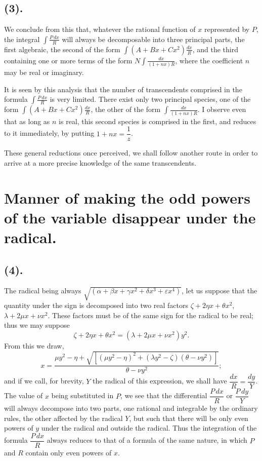 \documentclass{article}
\begin{document}
\subsection*{(3).}

We conclude from this that, whatever the rational function of $x$ represented by $P$, the integral $\displaystyle\int\frac{P\,dx}{R}$ will always be decomposable into three principal parts, the first algebraic, the second of the form $\displaystyle\int(A+Bx+Cx^{2})\frac{dx}{R}$, and the third containing one or more terms of the form $\displaystyle N\int\frac{dx}{(1+nx)R}$, where the coefficient $n$ may be real or imaginary.

It is seen by this analysis that the number of transcendents comprised in the formula $\displaystyle\int\frac{P\,dx}{R}$ is very limited. There exist only two principal species, one of the form $\displaystyle\int(A+Bx+Cx^{2})\frac{dx}{R}$, the other of the form $\displaystyle\int\frac{dx}{(1+nx)R}$. I observe even that as long as $n$ is real, this second species is comprised in the first, and reduces to it immediately, by putting $1+nx=\dfrac{1}{z}$.

These general reductions once perceived, we shall follow another route in order to arrive at a more precise knowledge of the same transcendents.


\section*{Manner of making the odd powers of the variable disappear under the radical.}

\subsection*{(4).}

The radical being always $\sqrt{(\alpha+\beta x+\gamma x^{2}+\delta x^{3}+\varepsilon x^{4})}$, let us suppose that the quantity under the sign is decomposed into two real factors $\zeta+2\eta x+\theta x^{2}$, $\lambda+2\mu x+\nu x^{2}$. These factors must be of the same sign for the radical to be real; thus we may suppose
\[ \zeta+2\eta x+\theta x^{2}=(\lambda+2\mu x+\nu x^{2})y^{2}. \]
From this we draw,
\[ x=\frac{\mu y^{2}-\eta+\sqrt{[(\mu y^{2}-\eta)^{2}+(\lambda y^{2}-\zeta)(\theta-\nu y^{2})]}}{\theta-\nu y^{2}}; \]
and if we call, for brevity, $Y$ the radical of this expression, we shall have $\dfrac{dx}{R}=\dfrac{dy}{Y}$. The value of $x$ being substituted in $P$, we see that the differential $\dfrac{P\,dx}{R}$ or $\dfrac{P\,dy}{Y}$ will always decompose into two parts, one rational and integrable by the ordinary rules, the other affected by the radical $Y$, but such that there will be only even powers of $y$ under the radical and outside the radical. Thus the integration of the formula $\dfrac{P\,dx}{R}$ always reduces to that of a formula of the same nature, in which $P$ and $R$ contain only even powers of $x$.
\end{document}
